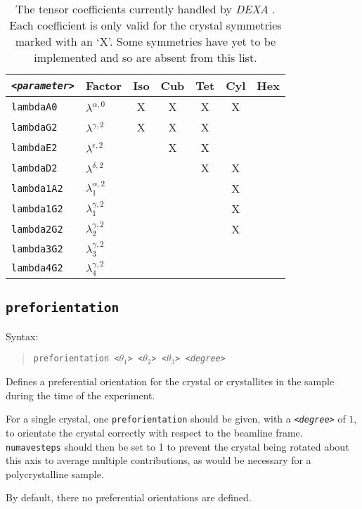 \documentclass[a4paper,12pt]{report}
\newcommand{\dexa}{\emph{DEXA} }
\begin{document}
\begin{table}
\begin{tabular}{ll|c c c c c}
\texttt{\emph{<parameter>}} & Factor & Iso & Cub & Tet & Cyl & Hex \\
\hline
 \verb|lambdaA0| & $\lambda^{\alpha,0}$    & X & X & X & X \\
 \verb|lambdaG2| & $\lambda^{\gamma,2}$    & X & X & X &   \\
 \verb|lambdaE2| & $\lambda^{\epsilon,2}$  &   & X & X &   \\
 \verb|lambdaD2| & $\lambda^{\delta,2}$    &   &   & X & X \\
 \verb|lambda1A2| & $\lambda_1^{\alpha,2}$ &   &   &   & X \\
 \verb|lambda1G2| & $\lambda_1^{\gamma,2}$ &   &   &   & X \\
 \verb|lambda2G2| & $\lambda_2^{\gamma,2}$ &   &   &   & X \\
 \verb|lambda3G2| & $\lambda_3^{\gamma,2}$ &   &   &   &   \\
 \verb|lambda4G2| & $\lambda_4^{\gamma,2}$ &   &   &   &   \\
\end{tabular}
\label{table:symmetry}
\caption{The tensor coefficients currently handled by \dexa. Each coefficient is only valid for the crystal symmetries marked with an `X'. Some symmetries have yet to be implemented and so are absent from this list.}
\end{table}


\subsection{\texttt{preforientation}}
Syntax:
\begin{quote}
  \texttt{preforientation \emph{<$\theta_1$> <$\theta_2$> <$\theta_3$> <degree>}}
\end{quote}
Defines a preferential orientation for the crystal or crystallites in the sample during the time of the experiment.

For a single crystal, one \verb|preforientation| should be given, with a \texttt{\emph{<degree>}} of $1$, to orientate the crystal correctly with respect to the beamline frame. \verb|numavesteps| should then be set to 1 to prevent the crystal being rotated about this axis to average multiple contributions, as would be necessary for a polycrystalline sample.

By default, there no preferential orientations are defined.
\end{document}
